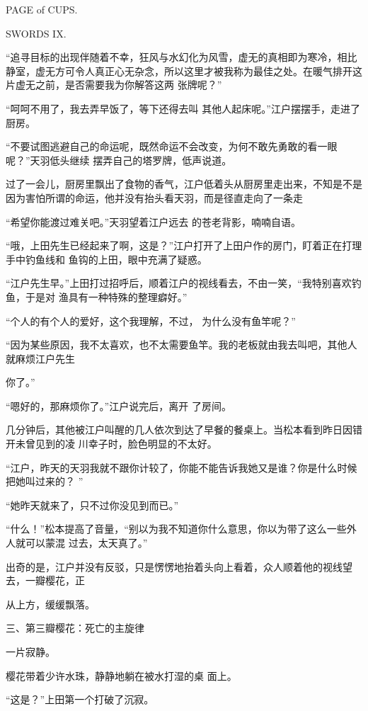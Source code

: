 \documentclass{article}
\begin{document}
PAGE of CUPS. 


SWORDS IX. 

“追寻目标的出现伴随着不幸，狂风与水幻化为风雪，虚无的真相即为寒冷，相比静室，虚无方可令人真正心无杂念，所以这里才被我称为最佳之处。在暖气排开这片虚无之前，是否需要我为你解答这两
张牌呢？” 

“呵呵不用了，我去弄早饭了，等下还得去叫
其他人起床呢。”江户摆摆手，走进了厨房。 

“不要试图逃避自己的命运呢，既然命运不会改变，为何不敢先勇敢的看一眼呢？”天羽低头继续
摆弄自己的塔罗牌，低声说道。 

\newpage

过了一会儿，厨房里飘出了食物的香气，江户低着头从厨房里走出来，不知是不是因为害怕所谓的命运，他并没有抬头看天羽，而是径直走向了一条走

“希望你能渡过难关吧。”天羽望着江户远去
的苍老背影，喃喃自语。 

“哦，上田先生已经起来了啊，这是？”江户打开了上田户作的房门，盯着正在打理手中钓鱼线和
鱼钩的上田，眼中充满了疑惑。 

“江户先生早。”上田打过招呼后，顺着江户的视线看去，不由一笑，“我特别喜欢钓鱼，于是对
渔具有一种特殊的整理癖好。” 

“个人的有个人的爱好，这个我理解，不过，
为什么没有鱼竿呢？” 

“因为某些原因，我不太喜欢，也不太需要鱼竿。我的老板就由我去叫吧，其他人就麻烦江户先生

\newpage
你了。” 

“嗯好的，那麻烦你了。”江户说完后，离开
了房间。 

几分钟后，其他被江户叫醒的几人依次到达了早餐的餐桌上。当松本看到昨日因错开未曾见到的凌
川幸子时，脸色明显的不太好。 

“江户，昨天的天羽我就不跟你计较了，你能不能告诉我她又是谁？你是什么时候把她叫过来的？
” 


“她昨天就来了，只不过你没见到而已。” 

“什么！”松本提高了音量，“别以为我不知道你什么意思，你以为带了这么一些外人就可以蒙混
过去，太天真了。” 

出奇的是，江户并没有反驳，只是愣愣地抬着头向上看着，众人顺着他的视线望去，一瓣樱花，正

\newpage
从上方，缓缓飘落。 


三、第三瓣樱花：死亡的主旋律 


一片寂静。 

樱花带着少许水珠，静静地躺在被水打湿的桌
面上。 


“这是？”上田第一个打破了沉寂。 
\end{document}
